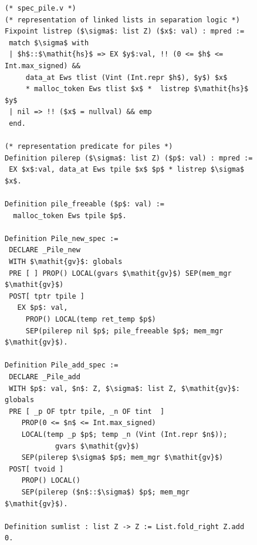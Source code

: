 \documentclass[runningheads,orivec]{llncs}
\begin{document}
\begin{figure}[tp]
\begin{minipage}[t]{3.2in}
\begin{lstlisting}[language=coq]
(* spec_pile.v *)
(* representation of linked lists in separation logic *)
Fixpoint listrep ($\sigma$: list Z) ($x$: val) : mpred :=
 match $\sigma$ with
 | $h$::$\mathit{hs}$ => EX $y$:val, !! (0 <= $h$ <=  Int.max_signed) && 
     data_at Ews tlist (Vint (Int.repr $h$), $y$) $x$ 
     * malloc_token Ews tlist $x$ *  listrep $\mathit{hs}$ $y$
 | nil => !! ($x$ = nullval) && emp
 end.

(* representation predicate for piles *)
Definition pilerep ($\sigma$: list Z) ($p$: val) : mpred :=
 EX $x$:val, data_at Ews tpile $x$ $p$ * listrep $\sigma$ $x$.

Definition pile_freeable ($p$: val) := 
  malloc_token Ews tpile $p$.

Definition Pile_new_spec :=
 DECLARE _Pile_new
 WITH $\mathit{gv}$: globals
 PRE [ ] PROP() LOCAL(gvars $\mathit{gv}$) SEP(mem_mgr $\mathit{gv}$)
 POST[ tptr tpile ]
   EX $p$: val, 
     PROP() LOCAL(temp ret_temp $p$)
     SEP(pilerep nil $p$; pile_freeable $p$; mem_mgr $\mathit{gv}$).

Definition Pile_add_spec :=
 DECLARE _Pile_add
 WITH $p$: val, $n$: Z, $\sigma$: list Z, $\mathit{gv}$: globals
 PRE [ _p OF tptr tpile, _n OF tint  ]
    PROP(0 <= $n$ <= Int.max_signed)
    LOCAL(temp _p $p$; temp _n (Vint (Int.repr $n$));
            gvars $\mathit{gv}$)
    SEP(pilerep $\sigma$ $p$; mem_mgr $\mathit{gv}$)
 POST[ tvoid ]
    PROP() LOCAL()
    SEP(pilerep ($n$::$\sigma$) $p$; mem_mgr $\mathit{gv}$).

Definition sumlist : list Z -> Z := List.fold_right Z.add 0.


\end{lstlisting}
\end{minipage}
\end{figure}
\end{document}
